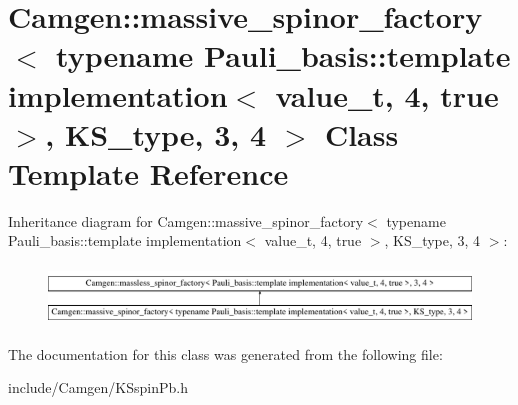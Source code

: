 \hypertarget{a00346}{\section{Camgen\-:\-:massive\-\_\-spinor\-\_\-factory$<$ typename Pauli\-\_\-basis\-:\-:template implementation$<$ value\-\_\-t, 4, true $>$, K\-S\-\_\-type, 3, 4 $>$ Class Template Reference}
\label{a00346}
}
Inheritance diagram for Camgen\-:\-:massive\-\_\-spinor\-\_\-factory$<$ typename Pauli\-\_\-basis\-:\-:template implementation$<$ value\-\_\-t, 4, true $>$, K\-S\-\_\-type, 3, 4 $>$\-:\begin{figure}[H]
\begin{center}
\leavevmode
\includegraphics[height=1.618497cm]{a00346}
\end{center}
\end{figure}


The documentation for this class was generated from the following file\-:\begin{DoxyCompactItemize}
\item 
include/\-Camgen/K\-Sspin\-Pb.\-h\end{DoxyCompactItemize}
